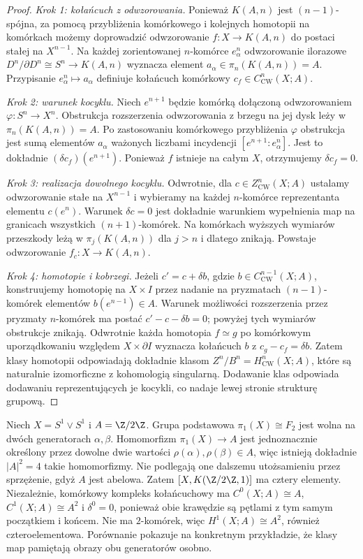 \begin{proof}
\emph{Krok 1: kołańcuch z odwzorowania.}
Ponieważ $K(A,n)$ jest $(n-1)$-spójna, za pomocą
przybliżenia komórkowego i kolejnych homotopii na komórkach
możemy doprowadzić odwzorowanie $f:X\to K(A,n)$ do postaci
stałej na $X^{n-1}$. Na każdej zorientowanej $n$-komórce
$e^n_\alpha$ odwzorowanie ilorazowe
$D^n/\partial D^n\cong S^n\to K(A,n)$
wyznacza element $a_\alpha\in\pi_n(K(A,n))=A$.
Przypisanie $e^n_\alpha\mapsto a_\alpha$ definiuje
kołańcuch komórkowy $c_f\in C^n_{\mathrm{CW}}(X;A)$.

\emph{Krok 2: warunek kocyklu.}
Niech $e^{n+1}$ będzie komórką dołączoną odwzorowaniem
$\varphi:S^n\to X^n$. Obstrukcja rozszerzenia odwzorowania
z brzegu na jej dysk leży w $\pi_n(K(A,n))=A$.
Po zastosowaniu komórkowego przybliżenia $\varphi$
obstrukcja jest sumą elementów $a_\alpha$ ważonych
liczbami incydencji $[e^{n+1}:e^n_\alpha]$.
Jest to dokładnie $(\delta c_f)(e^{n+1})$.
Ponieważ $f$ istnieje na całym $X$, otrzymujemy
$\delta c_f=0$.

\emph{Krok 3: realizacja dowolnego kocyklu.}
Odwrotnie, dla $c\in Z^n_{\mathrm{CW}}(X;A)$
ustalamy odwzorowanie stałe na $X^{n-1}$ i wybieramy na
każdej $n$-komórce reprezentanta elementu $c(e^n)$.
Warunek $\delta c=0$ jest dokładnie warunkiem
wypełnienia map na granicach wszystkich $(n+1)$-komórek.
Na komórkach wyższych wymiarów przeszkody leżą
w $\pi_j(K(A,n))$ dla $j>n$ i dlatego znikają.
Powstaje odwzorowanie $f_c:X\to K(A,n)$.

\emph{Krok 4: homotopie i kobrzegi.}
Jeżeli $c'=c+\delta b$, gdzie
$b\in C^{n-1}_{\mathrm{CW}}(X;A)$, konstruujemy
homotopię na $X\times I$ przez nadanie na pryzmatach
$(n-1)$-komórek elementów $b(e^{n-1})\in A$.
Warunek możliwości rozszerzenia przez pryzmaty
$n$-komórek ma postać
$c'-c-\delta b=0$; powyżej tych wymiarów obstrukcje
znikają. Odwrotnie każda homotopia $f\simeq g$ po
komórkowym uporządkowaniu względem $X\times\partial I$
wyznacza kołańcuch $b$ z $c_g-c_f=\delta b$.
Zatem klasy homotopii odpowiadają dokładnie klasom
$Z^n/B^n=H^n_{\mathrm{CW}}(X;A)$, które są naturalnie
izomorficzne z kohomologią singularną.
Dodawanie klas odpowiada dodawaniu reprezentujących
je kocykli, co nadaje lewej stronie strukturę grupową.
\end{proof}

\begin{przyklad}
Niech $X=S^1\vee S^1$ i $A=\Z/2\Z$. Grupa podstawowa
$\pi_1(X)\cong F_2$ jest wolna na dwóch generatorach
$\alpha,\beta$. Homomorfizm $\pi_1(X)\to A$ jest
jednoznacznie określony przez dowolne dwie wartości
$\rho(\alpha),\rho(\beta)\in A$, więc istnieją dokładnie
$|A|^2=4$ takie homomorfizmy. Nie podlegają one dalszemu
utożsamieniu przez sprzężenie, gdyż $A$ jest abelowa.
Zatem $[X,K(\Z/2\Z,1)]$ ma cztery elementy.
Niezależnie, komórkowy kompleks kołańcuchowy ma
$C^0(X;A)\cong A$, $C^1(X;A)\cong A^2$ i
$\delta^0=0$, ponieważ obie krawędzie są pętlami
z tym samym początkiem i końcem. Nie ma $2$-komórek,
więc $H^1(X;A)\cong A^2$, również czteroelementowa.
Porównanie pokazuje na konkretnym przykładzie, że
klasy map pamiętają obrazy obu generatorów osobno.
\end{przyklad}

